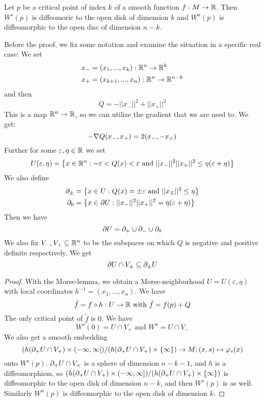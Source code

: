 \begin{prop}
    Let $p$ be a critical point of index $k$ of a smooth function $f: M \to { \mathbb R }$. Then
    $W^s(p)$ is diffeomoric to the open disk of dimension $k$ and $W^u(p)$ is diffeomorphic
    to the open disc of dimension $n - k$.
\end{prop}

\begin{definition}
    Before the proof, we fix some notation and examine the situation in a specific real case:
    We set 
    \begin{align*}
        x_- &= (x_1, ..., x_k) : { \mathbb R }^n \to { \mathbb R }^k \\
        x_+ &= (x_{k+1}, ..., x_n): { \mathbb R }^n \to { \mathbb R }^{n - k}
    \end{align*}
    and then
    \[ Q = - || x_- ||^2 + || x_+ ||^2 \]
    This is a map ${ \mathbb R }^n \to { \mathbb R }$, so we can utilize the gradient that we are used to. We get:
    \[ -{ \nabla } Q (x_-, x_+) = 2 (x_-, -x_+) \]
    Further for some $\varepsilon, \eta \in { \mathbb R }$ we set
    \[ U(\varepsilon, \eta) = \left\{ x \in { \mathbb R }^n : - \varepsilon < Q(x) < \varepsilon
    \text{ and } || x_- ||^2 || x_+ ||^2 \leq \eta(\varepsilon + \eta) \right\} \]
    We also define 
    \begin{align*}
        { \partial }_{\pm} &= \left\{ x \in U : Q(x) = \pm \varepsilon 
            \text{ and } || x_{\mp} ||^2 \leq \eta \right\} \\
        { \partial }_0 &= \left\{ x \in { \partial } U : || x_- ||^2 || x_+ ||^2 = \eta(\varepsilon + \eta) \right\} 
    \end{align*}
    Then we have
    \[ { \partial } U = { \partial }_+ \cup { \partial }_- \cup { \partial }_0 \]
    We also fix $V_-, V_+ \subseteq { \mathbb R }^n$ to be the subspaces on which $Q$ is negative and
    positive definite respectively.  We get 
    \[ { \partial } U \cap V_{\pm} \subseteq { \partial }_{\pm} U \]
\end{definition}

\begin{proof}
    With the Morse-lemma, we obtain a Morse-neighborhood $U = U(\varepsilon, \eta)$ 
    with local coordinates $h^{-1} = (x_1, ..., x_n)$. We have
    \[ \tilde{f} = f \circ h : U \to { \mathbb R } \text{ with } \tilde{f} = f(p) + Q \]
    The only critical point of $\tilde{f}$ is $0$. We have
    \[ W^s(0) = U \cap V_+ \text{ and } W^u = U \cap V_- \]
    We also get a smooth embedding
    \[ ( h({ \partial }_+ U \cap V_+) \times (-\infty, \infty]) /( h({ \partial }_+ U \cap V_+) \times \{ \infty \}) 
    \to M; (x, s) \mapsto \varphi_s(x) \] 
    onto $W^s(p)$.
    ${ \partial }_+ U \cap V_+$ is a sphere of dimension $n - k - 1$, and $h$ is a diffeomorphism,
    so $( h({ \partial }_+ U \cap V_+) \times (-\infty, \infty]) /( h({ \partial }_+ U \cap V_+) \times \{ \infty \})$
    is diffeomorphic to the open disk of dimension $n - k$, and then $W^s(p)$ is as well.
    Similarly $W^u(p)$ is diffeomorphic to the open disk of dimension $k$.
\end{proof}

